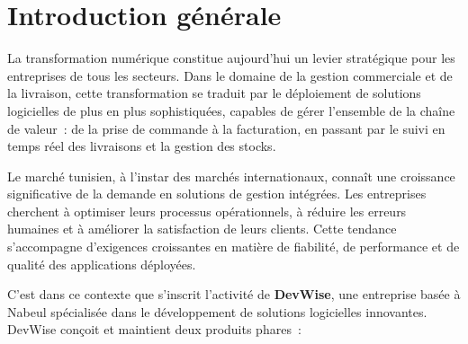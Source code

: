 
\chapter*{Introduction g\'{e}n\'{e}rale}

\vspace{0.5cm}


La transformation num\'{e}rique constitue aujourd'hui un levier strat\'{e}gique
pour les entreprises de tous les secteurs. Dans le domaine de la gestion
commerciale et de la livraison, cette transformation se traduit par le
d\'{e}ploiement de solutions logicielles de plus en plus sophistiqu\'{e}es,
capables de g\'{e}rer l'ensemble de la cha\^{i}ne de valeur~: de la prise de
commande \`{a} la facturation, en passant par le suivi en temps r\'{e}el des
livraisons et la gestion des stocks.

Le march\'{e} tunisien, \`{a} l'instar des march\'{e}s internationaux, conna\^{i}t une
croissance significative de la demande en solutions de gestion int\'{e}gr\'{e}es.
Les entreprises cherchent \`{a} optimiser leurs processus op\'{e}rationnels, \`{a}
r\'{e}duire les erreurs humaines et \`{a} am\'{e}liorer la satisfaction de leurs
clients. Cette tendance s'accompagne d'exigences croissantes en mati\`{e}re de
fiabilit\'{e}, de performance et de qualit\'{e} des applications d\'{e}ploy\'{e}es.

\vspace{0.3cm}


C'est dans ce contexte que s'inscrit l'activit\'{e} de \textbf{DevWise}, une
entreprise bas\'{e}e \`{a} Nabeul sp\'{e}cialis\'{e}e dans le d\'{e}veloppement de solutions
logicielles innovantes. DevWise con\c{c}oit et maintient deux produits
phares~:

